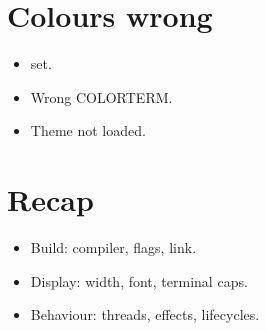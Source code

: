\section{Colours wrong}

\begin{itemize}[leftmargin=*]
  \item {} set.
  \item Wrong COLORTERM.
  \item Theme not loaded.
\end{itemize}

\section{Recap}

\begin{recap}
\begin{itemize}[leftmargin=*]
  \item Build: compiler, flags, link.
  \item Display: width, font, terminal caps.
  \item Behaviour: threads, effects, lifecycles.
\end{itemize}
\end{recap}
